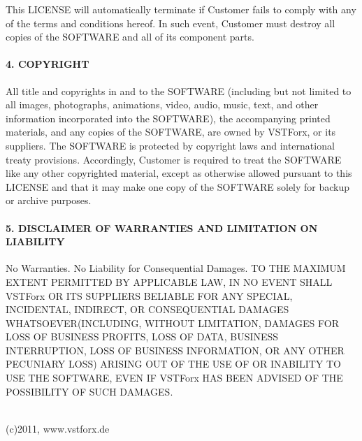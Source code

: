 This LICENSE will automatically terminate if Customer fails to comply with any of the terms and conditions hereof. In such event, Customer must destroy all copies of the SOFTWARE and all of its component parts.

\paragraph{4. COPYRIGHT}

All title and copyrights in and to the SOFTWARE (including but not limited to all images, photographs, animations, video, audio, music, text, and other information incorporated into the SOFTWARE), the accompanying printed materials, and any copies of the SOFTWARE, are owned by VSTForx, or its suppliers. The SOFTWARE is protected by copyright laws and international treaty provisions. Accordingly, Customer is required to treat the SOFTWARE like any other copyrighted material, except as otherwise allowed pursuant to this LICENSE and that it may make one copy of the SOFTWARE solely for backup or archive purposes.

\paragraph{5. DISCLAIMER OF WARRANTIES AND LIMITATION ON LIABILITY}

No Warranties. No Liability for Consequential Damages. TO THE MAXIMUM EXTENT PERMITTED BY APPLICABLE LAW, IN NO EVENT SHALL VSTForx OR ITS SUPPLIERS BELIABLE FOR ANY SPECIAL, INCIDENTAL, INDIRECT, OR CONSEQUENTIAL DAMAGES WHATSOEVER(INCLUDING, WITHOUT LIMITATION, DAMAGES FOR LOSS OF BUSINESS PROFITS, LOSS OF DATA, BUSINESS INTERRUPTION, LOSS OF BUSINESS INFORMATION, OR ANY OTHER PECUNIARY LOSS) ARISING OUT OF THE USE OF OR INABILITY TO USE THE SOFTWARE, EVEN IF VSTForx HAS BEEN ADVISED OF THE POSSIBILITY OF SUCH DAMAGES.
\\\\
\begin{flushright}
(c)2011, www.vstforx.de
\end{flushright}

